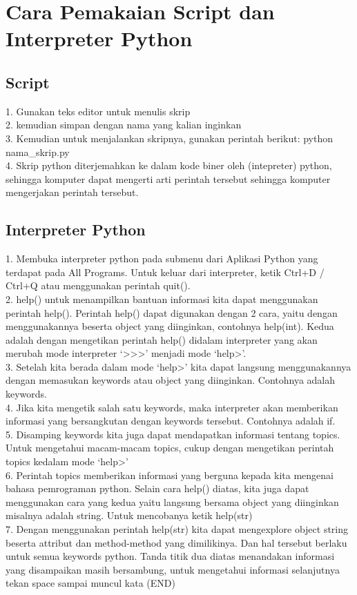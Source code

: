 \documentclass[lipt]{Article}
\begin{document}
\section{Cara Pemakaian Script dan Interpreter Python}
\subsection{Script}
1. Gunakan teks editor untuk menulis skrip\\
2. kemudian simpan dengan nama yang kalian inginkan\\
3. Kemudian untuk menjalankan skripnya, gunakan perintah berikut: python nama_skrip.py\\
4. Skrip python diterjemahkan ke dalam kode biner oleh (intepreter) python, sehingga komputer dapat mengerti arti perintah tersebut sehingga komputer mengerjakan perintah tersebut.\\
\subsection{Interpreter Python}
1. Membuka interpreter python pada submenu dari Aplikasi Python yang terdapat pada All Programs. Untuk keluar dari interpreter, ketik Ctrl+D / Ctrl+Q atau menggunakan perintah quit().\\
2. help() untuk menampilkan bantuan informasi kita dapat menggunakan perintah help(). Perintah help() dapat digunakan dengan 2 cara, yaitu dengan menggunakannya beserta object yang diinginkan, contohnya help(int). Kedua adalah dengan mengetikan perintah help() didalam interpreter yang akan merubah mode interpreter ‘>>>’ menjadi mode ‘help>’.\\
3. Setelah kita berada dalam mode ‘help>’ kita dapat langsung menggunakannya dengan memasukan keywords atau object yang diinginkan. Contohnya adalah keywords.\\
4. Jika kita mengetik salah satu keywords, maka interpreter akan memberikan informasi yang bersangkutan dengan keywords tersebut. Contohnya adalah if.\\
5. Disamping keywords kita juga dapat mendapatkan informasi tentang topics. Untuk mengetahui macam-macam topics, cukup dengan mengetikan perintah topics kedalam mode ‘help>’\\
6. Perintah topics memberikan informasi yang berguna kepada kita mengenai bahasa pemrograman python. Selain cara help() diatas, kita juga dapat menggunakan cara yang kedua yaitu langsung bersama object yang diinginkan misalnya adalah string. Untuk mencobanya ketik help(str)\\
7. Dengan menggunakan perintah help(str) kita dapat mengexplore object string beserta attribut dan method-method yang dimilikinya. Dan hal tersebut berlaku untuk semua keywords python. Tanda titik dua diatas menandakan informasi yang disampaikan masih bersambung, untuk mengetahui informasi selanjutnya tekan space sampai muncul kata (END)\\
\end{document}
